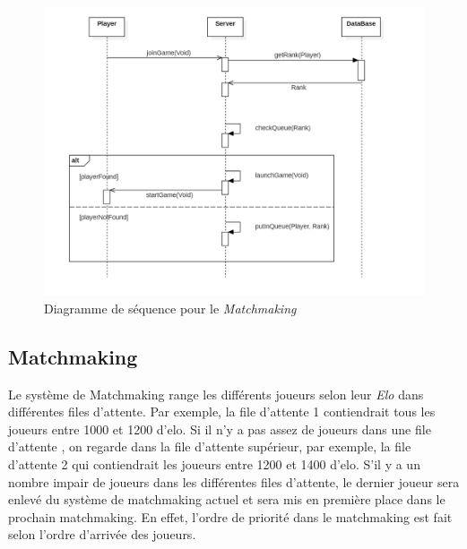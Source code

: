 \documentclass[10pt, a4paper]{article}
\begin{document}
\begin{figure}[H]
\centering
\includegraphics[scale=0.72]{SequenceDiagramMatchmaking.png}
\caption{Diagramme de séquence pour le \textit{Matchmaking}}
\label{SD_matchmaker} %
\end{figure}

\subsection{Matchmaking}
Le système de Matchmaking range les différents joueurs selon leur \textit{Elo} dans différentes files d'attente. Par exemple, la file d'attente 1 contiendrait tous les joueurs entre 1000 et 1200 d'elo. Si il n'y a pas assez de joueurs dans une file d'attente , on regarde dans la file d'attente supérieur, par exemple, la file d'attente 2 qui contiendrait les joueurs entre 1200 et 1400 d'elo. S'il y a un nombre impair de joueurs dans les différentes files d'attente, le dernier joueur sera enlevé du système de matchmaking actuel et sera mis en première place dans le prochain matchmaking. En effet, l'ordre de priorité dans le matchmaking est fait selon l'ordre d'arrivée des joueurs.
\end{document}
